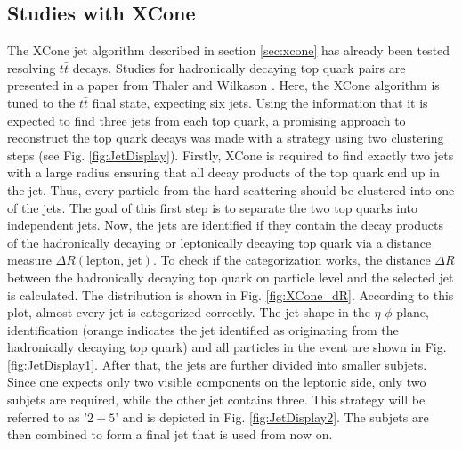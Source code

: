 \subsection{Studies with XCone}
\label{sec:XCone_strat}
	The XCone jet algorithm described in section \ref{sec:xcone} has already been tested resolving $t\bar{t}$ decays. Studies for hadronically decaying top quark pairs are presented in a paper from Thaler and Wilkason \cite{xconetop}. Here, the XCone algorithm is tuned to the $t\bar{t}$ final state, expecting six jets. Using the information that it is expected to find three jets from each top quark, a promising approach to reconstruct the top quark decays was made with a strategy using two clustering steps (see Fig. \ref{fig:JetDisplay}). Firstly, XCone is required to find exactly two jets with a large radius ensuring that all decay products of the top quark end up in the jet. Thus, every particle from the hard scattering should be clustered into one of the jets. The goal of this first step is to separate the two top quarks into independent jets.  Now, the jets are identified if they contain the decay products of the hadronically decaying or leptonically decaying top quark via a distance measure $\Delta R (\text{lepton, jet})$. To check if the categorization works, the distance $\Delta R$ between the hadronically decaying top quark on particle level and the selected jet is calculated. The distribution is shown in Fig. \ref{fig:XCone_dR}. According to this plot, almost every jet is categorized correctly. The jet shape in the $\eta$-$\phi$-plane, identification (orange indicates the jet identified as originating from the hadronically decaying top quark) and all particles in the event are shown in Fig. \ref{fig:JetDisplay1}. After that, the jets are further divided into smaller subjets. Since one expects only two visible components on the leptonic side, only two subjets are required, while the other jet contains three. This strategy will be referred to as '$2+5$' and is depicted in Fig. \ref{fig:JetDisplay2}. The subjets are then combined to form a final jet that is used from now on.	
	
